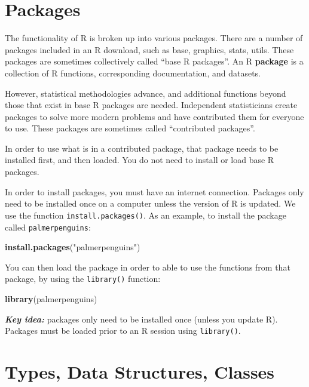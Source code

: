 \documentclass[
]{book}
\newenvironment{Shaded}{\begin{snugshade}}{\end{snugshade}}
\newcommand{\FunctionTok}[1]{\textcolor[rgb]{0.13,0.29,0.53}{\textbf{#1}}}
\newcommand{\NormalTok}[1]{#1}
\newcommand{\StringTok}[1]{\textcolor[rgb]{0.31,0.60,0.02}{#1}}
\theoremstyle{definition}
\theoremstyle{definition}
\theoremstyle{definition}
\theoremstyle{definition}
\theoremstyle{remark}
\begin{document}
\hypertarget{packages}{%
\section{Packages}\label{packages}}

The functionality of R is broken up into various packages. There are a number of packages included in an R download, such as base, graphics, stats, utils. These packages are sometimes collectively called ``base R packages''. An R \textbf{package} is a collection of R functions, corresponding documentation, and datasets.

However, statistical methodologies advance, and additional functions beyond those that exist in base R packages are needed. Independent statisticians create packages to solve more modern problems and have contributed them for everyone to use. These packages are sometimes called ``contributed packages''.

In order to use what is in a contributed package, that package needs to be installed first, and then loaded. You do not need to install or load base R packages.

In order to install packages, you must have an internet connection. Packages only need to be installed once on a computer unless the version of R is updated. We use the function \texttt{install.packages()}. As an example, to install the package called \texttt{palmerpenguins}:

\begin{Shaded}
\begin{Highlighting}[]
\FunctionTok{install.packages}\NormalTok{(}\StringTok{"palmerpenguins"}\NormalTok{)}
\end{Highlighting}
\end{Shaded}

You can then load the package in order to able to use the functions from that package, by using the \texttt{library()} function:

\begin{Shaded}
\begin{Highlighting}[]
\FunctionTok{library}\NormalTok{(palmerpenguins)}
\end{Highlighting}
\end{Shaded}

\textbf{\emph{Key idea:}} packages only need to be installed once (unless you update R). Packages must be loaded prior to an R session using \texttt{library()}.

\hypertarget{structures}{%
\section{Types, Data Structures, Classes}\label{structures}}
\end{document}
